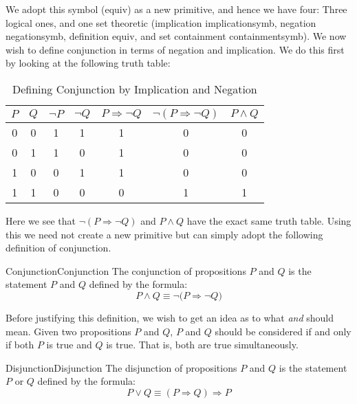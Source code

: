        We adopt this symbol (\gls{equiv}) as a new primitive, and hence we have
        four: Three logical ones, and one set theoretic
        (implication \gls{implicationsymb}, negation \gls{negationsymb},
        definition \gls{equiv}, and set containment \gls{containmentsymb}). We
        now wish to define conjunction in terms of negation and implication. We
        do this first by looking at the following truth table:
        \begin{table}[H]
            \centering
            \captionsetup{type=table}
            \begin{tabular}{ccccccc}
                $P$&$Q$&$\neg{P}$&$\neg{Q}$&$P\Rightarrow\neg{Q}$
                    &$\neg(P\Rightarrow\neg{Q})$&$P\land{Q}$\\
                \hline
                0&0&1&1&1&0&0\\
                0&1&1&0&1&0&0\\
                1&0&0&1&1&0&0\\
                1&1&0&0&0&1&1
            \end{tabular}
            \caption{Defining Conjunction by Implication and Negation}
            \label{tab:Def_Conj_by_Imp_and_Neg}
        \end{table}
        Here we see that $\neg(P\Rightarrow\neg{Q})$ and $P\land{Q}$ have the
        exact same truth table. Using this we need not create a new primitive
        but can simply adopt the following definition of conjunction.
        \begin{fdefinition}{Conjunction}{Conjunction}
            The conjunction of propositions $P$ and $Q$ is the statement $P$ and
            $Q$ defined by the formula:
            \begin{equation*}
                P\land{Q}\equiv\neg\big(P\Rightarrow\neg{Q}\big)
            \end{equation*}
        \end{fdefinition}
        Before justifying this definition, we wish to get an idea as to what
        \textit{and} should mean. Given two propositions $P$ and $Q$, $P$ and
        $Q$ should be considered if and only if both $P$ is true and $Q$ is
        true. That is, both are true simultaneously.
        \par\hfill\par
        \begin{fdefinition}{Disjunction}{Disjunction}
            The disjunction of propositions $P$ and $Q$ is the statement $P$ or
            $Q$ defined by the formula:
            \begin{equation*}
                P\lor{Q}\equiv(P\Rightarrow{Q})\Rightarrow{P}
            \end{equation*}
        \end{fdefinition}

